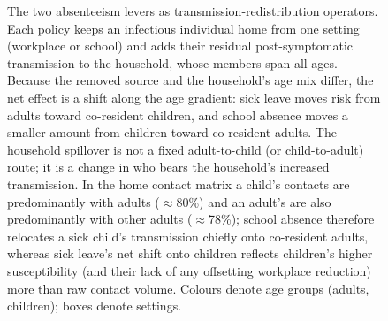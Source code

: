 \documentclass[12pt]{article}
\theoremstyle{plain}
\theoremstyle{remark}
\theoremstyle{definition}
\begin{document}
\begin{figure}[H]
\centering
{}
\caption{The two absenteeism levers as transmission-redistribution operators.
Each policy keeps an infectious individual home from one setting (workplace or
school) and adds their residual post-symptomatic transmission to the household,
whose members span all ages. Because the removed source and the household's age
mix differ, the net effect is a shift along the age gradient: sick leave moves
risk from adults toward co-resident children, and school absence moves a smaller
amount from children toward co-resident adults. The household spillover is not a
fixed adult-to-child (or child-to-adult) route; it is a change in who bears the
household's increased transmission. In the home contact matrix a child's
contacts are predominantly with adults ($\approx$80\%) and an adult's are also
predominantly with other adults ($\approx$78\%); school absence therefore
relocates a sick child's transmission chiefly onto co-resident adults, whereas
sick leave's net shift onto children reflects children's higher susceptibility
(and their lack of any offsetting workplace reduction) more than raw contact
volume. Colours denote age groups (\textcolor{adultc}{adults},
\textcolor{childc}{children}); boxes denote settings.}
\label{fig:mechanism}
\end{figure}
\end{document}
